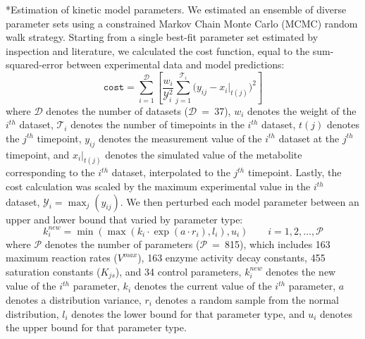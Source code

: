 \documentclass[12pt]{article}
\makeatletter
\renewcommand\subsection{\@startsection
	{subsection}{2}{0mm}
	{-0.05in}
	{-0.5\baselineskip}
	{\normalfont\normalsize\bfseries}}
\makeatother
\begin{document}
\subsection*{Estimation of kinetic model parameters.}
We estimated an ensemble of diverse parameter sets using a constrained Markov Chain Monte Carlo (MCMC) random walk strategy.
Starting from a single best-fit parameter set estimated by inspection and literature, we calculated the cost function, equal to the sum-squared-error between experimental data and model predictions:
\begin{equation}\label{eqn:cost-function}
    \texttt{cost}=\sum_{i=1}^{\mathcal{D}}\left[\frac{w_i}{\mathcal{Y}_{i}^2}\sum_{j=1}^{\mathcal{T}_i}\bigg(y_{ij}-x_{i}|_{t(j)}\bigg)^2 \right]
\end{equation}
where $\mathcal{D}$ denotes the number of datasets ($\mathcal{D}$~=~37),
$w_i$ denotes the weight of the $i^{th}$ dataset,
$\mathcal{T}_i$ denotes the number of timepoints in the $i^{th}$ dataset,
$t(j)$ denotes the $j^{th}$ timepoint, $y_{ij}$ denotes the measurement value of the $i^{th}$ dataset at the $j^{th}$ timepoint,
and $x_{i}|_{t(j)}$ denotes the simulated value of the metabolite corresponding to the $i^{th}$ dataset, interpolated to the $j^{th}$ timepoint.
Lastly, the cost calculation was scaled by the maximum experimental value in the $i^{th}$ dataset, $\mathcal{Y}_{i}=\max_{j}\left(y_{ij}\right)$.
We then perturbed each model parameter between an upper and lower bound that varied by parameter type:
\begin{equation}\label{eqn:parameter-perturbation}
    k_i^{new}=\min\left(\max\left(k_i \cdot \exp(a \cdot r_i),l_i\right),u_i\right)\qquad{i=1,2,\hdots,\mathcal{P}}
\end{equation}
where $\mathcal{P}$ denotes the number of parameters ($\mathcal{P}$~=~815), which includes 163 maximum reaction rates ($V^{max}$), 163 enzyme activity decay constants, 455 saturation constants ($K_{js}$), and 34 control parameters, $k_i^{new}$ denotes the new value of the $i^{th}$ parameter, $k_i$ denotes the current value of the $i^{th}$ parameter, $a$ denotes a distribution variance, $r_i$ denotes a random sample from the normal distribution, $l_i$ denotes the lower bound for that parameter type, and $u_i$ denotes the upper bound for that parameter type.
\end{document}

